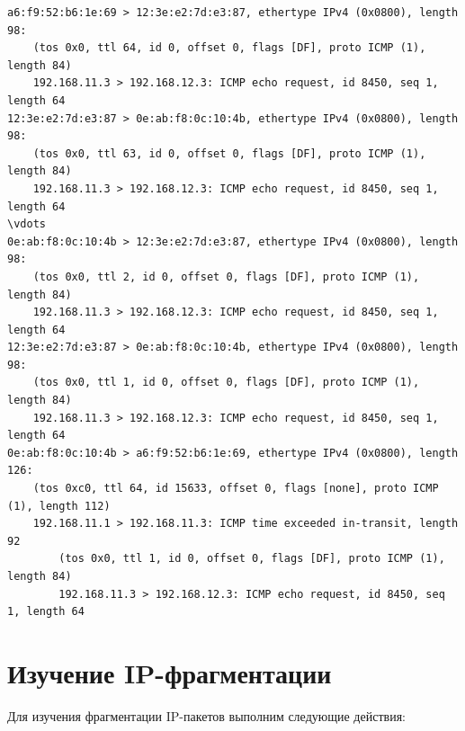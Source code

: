 \documentclass[a4paper,12pt]{article}
\begin{document}
\begin{Verbatim}
a6:f9:52:b6:1e:69 > 12:3e:e2:7d:e3:87, ethertype IPv4 (0x0800), length 98:
    (tos 0x0, ttl 64, id 0, offset 0, flags [DF], proto ICMP (1), length 84) 
    192.168.11.3 > 192.168.12.3: ICMP echo request, id 8450, seq 1, length 64
12:3e:e2:7d:e3:87 > 0e:ab:f8:0c:10:4b, ethertype IPv4 (0x0800), length 98:
    (tos 0x0, ttl 63, id 0, offset 0, flags [DF], proto ICMP (1), length 84)
    192.168.11.3 > 192.168.12.3: ICMP echo request, id 8450, seq 1, length 64
\vdots
0e:ab:f8:0c:10:4b > 12:3e:e2:7d:e3:87, ethertype IPv4 (0x0800), length 98:
    (tos 0x0, ttl 2, id 0, offset 0, flags [DF], proto ICMP (1), length 84)
    192.168.11.3 > 192.168.12.3: ICMP echo request, id 8450, seq 1, length 64
12:3e:e2:7d:e3:87 > 0e:ab:f8:0c:10:4b, ethertype IPv4 (0x0800), length 98:
    (tos 0x0, ttl 1, id 0, offset 0, flags [DF], proto ICMP (1), length 84)
    192.168.11.3 > 192.168.12.3: ICMP echo request, id 8450, seq 1, length 64
0e:ab:f8:0c:10:4b > a6:f9:52:b6:1e:69, ethertype IPv4 (0x0800), length 126:
    (tos 0xc0, ttl 64, id 15633, offset 0, flags [none], proto ICMP (1), length 112)
    192.168.11.1 > 192.168.11.3: ICMP time exceeded in-transit, length 92
	    (tos 0x0, ttl 1, id 0, offset 0, flags [DF], proto ICMP (1), length 84)
	    192.168.11.3 > 192.168.12.3: ICMP echo request, id 8450, seq 1, length 64
\end{Verbatim}

\section{Изучение IP-фрагментации}

Для изучения фрагментации IP-пакетов выполним следующие действия:
\end{document}
